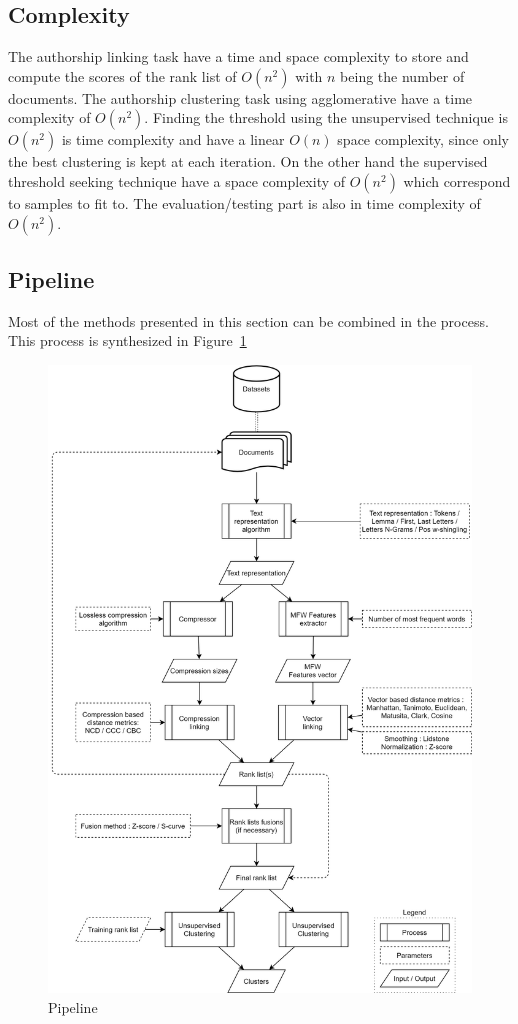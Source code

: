 \subsection{Complexity}

The authorship linking task have a time and space complexity to store and compute the scores of the rank list of $O(n^2)$ with $n$ being the number of documents.
The authorship clustering task using agglomerative have a time complexity of $O(n^2)$.
Finding the threshold using the unsupervised technique is $O(n^2)$ is time complexity and have a linear $O(n)$ space complexity, since only the best clustering is kept at each iteration.
On the other hand the supervised threshold seeking technique have a space  complexity of $O(n^2)$ which correspond to samples to fit to.
The evaluation/testing part is also in time complexity of $O(n^2)$.

\subsection{Pipeline}

Most of the methods presented in this section can be combined in the process. This process is synthesized in Figure~\ref{fig:pipeline}

\onecolumn
\begin{figure}[p]
  \centering
  \caption{Pipeline}
  \label{fig:pipeline}
  \includegraphics[width=\textwidth,height=\textheight,keepaspectratio]{img/pipeline.png}
\end{figure}
\twocolumn
